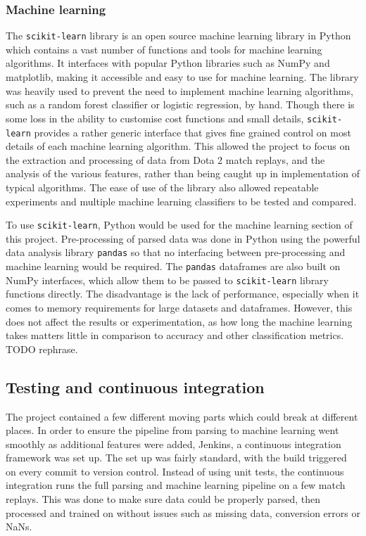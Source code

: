 \documentclass[Report.tex]{subfiles}
\begin{document}
\subsubsection{Machine learning}
The \texttt{scikit-learn} library \cite{sklearn} is an open source machine learning library in Python which contains a vast number of functions and tools for machine learning algorithms. It interfaces with popular Python libraries such as NumPy and matplotlib, making it accessible and easy to use for machine learning. The library was heavily used to prevent the need to implement machine learning algorithms, such as a random forest classifier or logistic regression, by hand. Though there is some loss in the ability to customise cost functions and small details, \texttt{scikit-learn} provides a rather generic interface that gives fine grained control on most details of each machine learning algorithm. This allowed the project to focus on the extraction and processing of data from Dota 2 match replays, and the analysis of the various features, rather than being caught up in implementation of typical algorithms. The ease of use of the library also allowed repeatable experiments and multiple machine learning classifiers to be tested and compared.

To use \texttt{scikit-learn}, Python would be used for the machine learning section of this project. Pre-processing of parsed data was done in Python using the powerful data analysis library \texttt{pandas} \cite{pandas} so that no interfacing between pre-processing and machine learning would be required. The \texttt{pandas} dataframes are also built on NumPy interfaces, which allow them to be passed to \texttt{scikit-learn} library functions directly. The disadvantage is the lack of performance, especially when it comes to memory requirements for large datasets and dataframes. However, this does not affect the results or experimentation, as how long the machine learning takes matters little in comparison to accuracy and other classification metrics. TODO rephrase.

\subsection{Testing and continuous integration}
The project contained a few different moving parts which could break at different places. In order to ensure the pipeline from parsing to machine learning went smoothly as additional features were added, Jenkins, a continuous integration framework was set up. The set up was fairly standard, with the build triggered on every commit to version control. Instead of using unit tests, the continuous integration runs the full parsing and machine learning pipeline on a few match replays. This was done to make sure data could be properly parsed, then processed and trained on without issues such as missing data, conversion errors or NaNs. 
\end{document}
